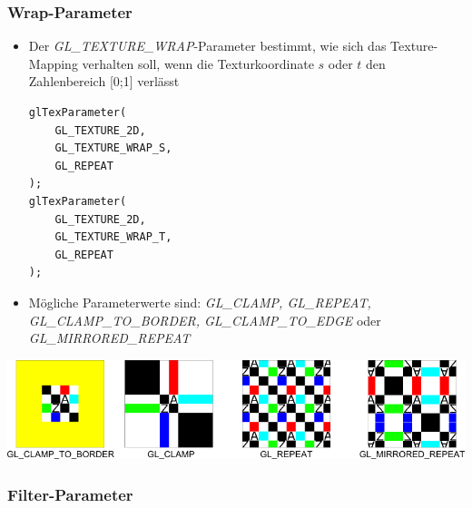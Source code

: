\documentclass{scrartcl}
\begin{document}
\subsubsection{Wrap-Parameter}

\begin{itemize}
	\item Der \textit{GL\_TEXTURE\_WRAP}-Parameter bestimmt, wie sich das Texture-Mapping verhalten soll, wenn die Texturkoordinate $s$ oder $t$ den Zahlenbereich [0;1] verlässt
	\begin{lstlisting}
glTexParameter(
	GL_TEXTURE_2D,
	GL_TEXTURE_WRAP_S,
	GL_REPEAT
);
glTexParameter(
	GL_TEXTURE_2D,
	GL_TEXTURE_WRAP_T,
	GL_REPEAT
);
	\end{lstlisting}
	\item Mögliche Parameterwerte sind: \textit{GL\_CLAMP, GL\_REPEAT, GL\_CLAMP\_TO\_BORDER, GL\_CLAMP\_TO\_EDGE} oder \textit{GL\_MIRRORED\_REPEAT}
\end{itemize}

\includegraphics[scale=0.35]{figures/texture_wrap.png}

\subsubsection{Filter-Parameter}
\end{document}
